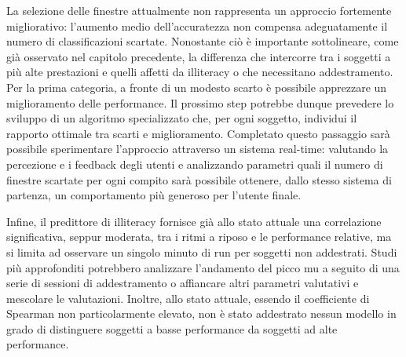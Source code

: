 La selezione delle finestre attualmente non rappresenta un approccio fortemente migliorativo: l'aumento medio dell'accuratezza non compensa adeguatamente il numero di classificazioni scartate. Nonostante ciò è importante sottolineare, come già osservato nel capitolo precedente, la differenza che intercorre tra i soggetti a più alte prestazioni e quelli affetti da illiteracy o che necessitano addestramento. Per la prima categoria, a fronte di un modesto scarto è possibile apprezzare un miglioramento delle performance. Il prossimo step potrebbe dunque prevedere lo sviluppo di un algoritmo specializzato che, per ogni soggetto, individui il rapporto ottimale tra scarti e miglioramento. Completato questo passaggio sarà possibile sperimentare l'approccio attraverso un sistema real-time: valutando la percezione e i feedback degli utenti e analizzando parametri quali il numero di finestre scartate per ogni compito sarà possibile ottenere, dallo stesso sistema di partenza, un comportamento più generoso per l'utente finale.

Infine, il predittore di illiteracy fornisce già allo stato attuale una correlazione significativa, seppur moderata, tra i ritmi a riposo e le performance relative, ma si limita ad osservare un singolo minuto di run per soggetti non addestrati. Studi più approfonditi potrebbero analizzare l'andamento del picco mu a seguito di una serie di sessioni di addestramento o affiancare altri parametri valutativi e mescolare le valutazioni. Inoltre, allo stato attuale, essendo il coefficiente di Spearman non particolarmente elevato, non è stato addestrato nessun modello in grado di distinguere soggetti a basse performance da soggetti ad alte performance.